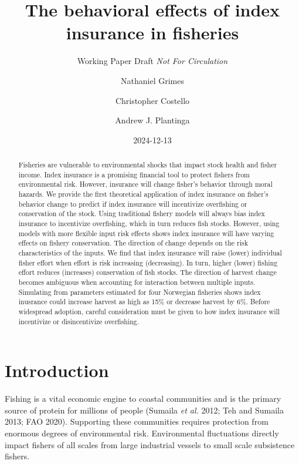 \documentclass[
  letterpaper,
  DIV=11,
  numbers=noendperiod]{scrartcl}
\title{The behavioral effects of index insurance in fisheries}
\subtitle{Working Paper Draft \emph{Not For Circulation}}
\author{Nathaniel Grimes \and Christopher Costello \and Andrew J.
Plantinga}
\date{2024-12-13}
\renewcommand*\contentsname{Table of contents}
\newcommand\contentsname{Table of contents}
\theoremstyle{plain}
\theoremstyle{plain}
\theoremstyle{remark}
\begin{document}
\maketitle
\begin{abstract}
Fisheries are vulnerable to environmental shocks that impact stock
health and fisher income. Index insurance is a promising financial tool
to protect fishers from environmental risk. However, insurance will
change fisher's behavior through moral hazards. We provide the first
theoretical application of index insurance on fisher's behavior change
to predict if index insurance will incentivize overfishing or
conservation of the stock. Using traditional fishery models will always
bias index insurance to incentivize overfishing, which in turn reduces
fish stocks. However, using models with more flexible input risk effects
shows index insurance will have varying effects on fishery conservation.
The direction of change depends on the risk characteristics of the
inputs. We find that index insurance will raise (lower) individual
fisher effort when effort is risk increasing (decreasing). In turn,
higher (lower) fishing effort reduces (increases) conservation of fish
stocks. The direction of harvest change becomes ambiguous when
accounting for interaction between multiple inputs. Simulating from
parameters estimated for four Norwegian fisheries shows index inusrance
could increase harvest as high as 15\% or decrease harvest by 6\%.
Before widespread adoption, careful consideration must be given to how
index insurance will incentivize or disincentivize overfishing.
\end{abstract}
\ifdefined\Shaded\renewenvironment{Shaded}{\begin{tcolorbox}[borderline west={3pt}{0pt}{shadecolor}, sharp corners, boxrule=0pt, enhanced, interior hidden, frame hidden, breakable]}{\end{tcolorbox}}\fi

\renewcommand*\contentsname{Table of contents}
{
\hypersetup{linkcolor=}
\setcounter{tocdepth}{3}
\tableofcontents
}
\hypertarget{introduction}{%
\section{Introduction}\label{introduction}}

Fishing is a vital economic engine to coastal communities and is the
primary source of protein for millions of people (Sumaila \emph{et al.}
2012; Teh and Sumaila 2013; FAO 2020). Supporting these communities
requires protection from enormous degrees of environmental risk.
Environmental fluctuations directly impact fishers of all scales from
large industrial vessels to small scale subsistence fishers.
\end{document}
